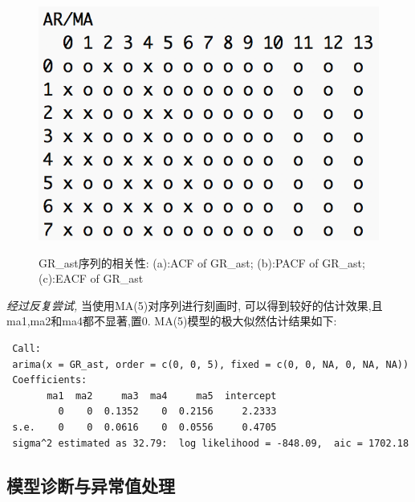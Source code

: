 \begin{figure}[h!]
	\hspace{0.04\textwidth}
	\begin{minipage}[ht]{0.3\textwidth}
	\centering
	\includegraphics[width=1\textwidth]{pic/ast/eacf(gr_ast)}
	\subcaption{}\label{eacf(gr_ast)}
\end{minipage}
	\caption{GR\_ast序列的相关性: (a):ACF of GR\_ast; (b):PACF of GR\_ast; (c):EACF of GR\_ast}\label{gr_ast_ape}
\end{figure}
\emph{经过反复尝试,} 当使用MA(5)对序列进行刻画时, 可以得到较好的估计效果,且ma1,ma2和ma4都不显著,置0. MA(5)模型的极大似然估计结果如下:
\begin{framed}
\begin{verbatim}
 Call:
 arima(x = GR_ast, order = c(0, 0, 5), fixed = c(0, 0, NA, 0, NA, NA))
 Coefficients:
       ma1  ma2     ma3  ma4     ma5  intercept
         0    0  0.1352    0  0.2156     2.2333
 s.e.    0    0  0.0616    0  0.0556     0.4705
 sigma^2 estimated as 32.79:  log likelihood = -848.09,  aic = 1702.18
\end{verbatim}
\end{framed}





\subsection{模型诊断与异常值处理}

